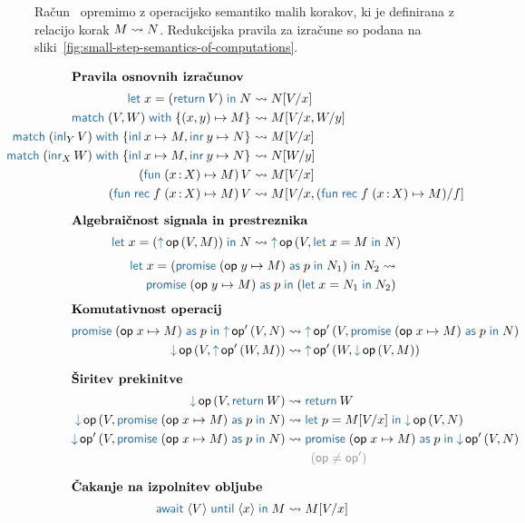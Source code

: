 Račun \lae\ opremimo z operacijsko semantiko malih korakov, ki je definirana z relacijo korak $M \leadsto N$. Redukcijska pravila za izračune so podana na sliki~\ref{fig:small-step-semantics-of-computations}. 

\begin{figure}[H]
	\centering
	\small
	\begin{align*}
	\intertext{\textbf{Pravila osnovnih izračunov}}
	\tmlet{x}{(\tmreturn V)}{N} &\reduces N[V/x]
	\\
	\tmmatch{\tmpair{V}{W}}{\tmpair{x}{y} \mapsto M} &\reduces M[V/x, W/y]
	\\
	\mathllap{\tmmatch{(\tminl[Y]{V})}{\tminl{x} \mapsto M, \tminr{y} \mapsto N}} &\reduces	M[V/x]
	\\
	\mathllap{\tmmatch{(\tminr[X]{W})}{\tminl{x} \mapsto M, \tminr{y} \mapsto N}} &\reduces	N[W/y]
	\\
	\tmapp{(\tmfun{x \of X}{M})}{V} &\reduces M[V/x]
	\\
	\tmapp{(\tmfunrec{f}{x \of X}{M})}{V} &\reduces M[V/x, (\tmfunrec{f}{x \of X}{M})/f]
	\\[1ex]
	\intertext{\textbf{Algebraičnost signala in prestreznika}}
	\tmlet{x}{(\tmopout{op}{V}{M})}{N} &\reduces \tmopout{op}{V}{\tmlet{x}{M}{N}}
	\end{align*}
	\vspace{-6ex}
	\begin{align*}
	\tmlet{x}{(\tmwith{op}{y}{M}{p}{N_1})}{N_2} \reduces \\
	\tmwith{op}{y}{M}{p}{(\tmlet{x}{N_1}{N_2})}
	\end{align*}
	\vspace{-6ex}
	\begin{align*}
	\intertext{\textbf{Komutativnost operacij}}
	\tmwith{op}{x}{M}{p}{\tmopout{op'}{V}{N}} &\reduces \tmopout{op'}{V}{\tmwith{op}{x}{M}{p}{N}}
	\\
	\tmopin{op}{V}{\tmopout{op'}{W}{M}} &\reduces \tmopout{op'}{W}{\tmopin{op}{V}{M}}
	\\[1ex]
	\intertext{\textbf{Širitev prekinitve}}
	\tmopin{op}{V}{\tmreturn W} &\reduces \tmreturn W
	\\
	\tmopin{op}{V}{\tmwith{op}{x}{M}{p}{N}} &\reduces \tmlet{p}{M[V/x]}{\tmopin{op}{V}{N}}
	\\
	\tmopin{op'}{V}{\tmwith{op}{x}{M}{p}{N}} &\reduces \tmwith{op}{x}{M}{p}{\tmopin{op'}{V}{N}} \\
	&\qquad {\color{rulenameColor}(\op \neq \op')}
	\\[1ex]
	\intertext{\textbf{Čakanje na izpolnitev obljube}}
	\tmawait{\tmpromise V}{x}{M} &\reduces M[V/x]
	\end{align*}
	

\end{figure}
